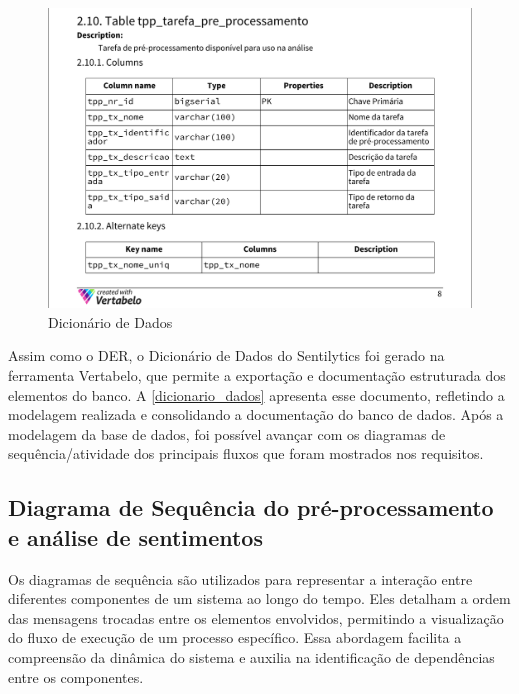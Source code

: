 \documentclass[
	12pt,				%
	oneside,			%
	a4paper,			%
	english,			%
	french,				%
	spanish,			%
	brazil				%
	]{abntex2}
\begin{document}
\begin{figure}[htbp]
\hypertarget{dicionario_dados}{%
\caption{Dicionário de Dados}\label{dicionario_dados}
\begin{center}
\includegraphics[scale=0.3]{imagens/sentilytics/diagramas/dicionario_dados.png}
\end{center}
}
\end{figure}

Assim como o DER, o Dicionário de Dados do Sentilytics foi gerado na
ferramenta Vertabelo, que permite a exportação e documentação
estruturada dos elementos do banco. A \autoref{dicionario_dados}
apresenta esse documento, refletindo a modelagem realizada e
consolidando a documentação do banco de dados. Após a modelagem da base
de dados, foi possível avançar com os diagramas de sequência/atividade
dos principais fluxos que foram mostrados nos requisitos.

\hypertarget{diagrama-de-sequuxeancia-do-pruxe9-processamento-e-anuxe1lise-de-sentimentos}{%
\subsection{Diagrama de Sequência do pré-processamento e análise de
sentimentos}\label{diagrama-de-sequuxeancia-do-pruxe9-processamento-e-anuxe1lise-de-sentimentos}}

Os diagramas de sequência são utilizados para representar a interação
entre diferentes componentes de um sistema ao longo do tempo. Eles
detalham a ordem das mensagens trocadas entre os elementos envolvidos,
permitindo a visualização do fluxo de execução de um processo
específico. Essa abordagem facilita a compreensão da dinâmica do sistema
e auxilia na identificação de dependências entre os componentes.
\end{document}

